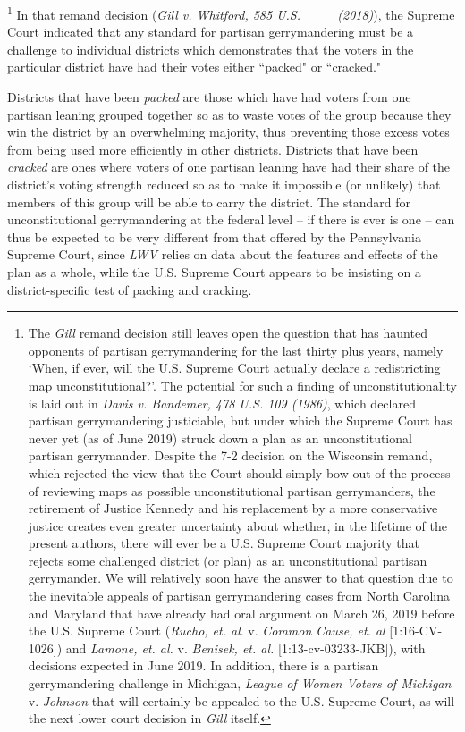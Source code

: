         \footnote{The \textit{Gill} remand decision still leaves open the question that has haunted opponents of partisan gerrymandering for the last thirty plus years, namely `When, if ever, will the U.S. Supreme Court actually declare a redistricting map unconstitutional?'.  The potential for such a finding of unconstitutionality is laid out in \textit{Davis v. Bandemer, 478 U.S. 109 (1986)}, which declared partisan gerrymandering justiciable, but under which the Supreme Court has never yet (as of June 2019) struck down a plan as an unconstitutional partisan gerrymander. Despite the 7-2 decision on the Wisconsin remand, which rejected the view that the Court should simply bow out of the process of reviewing maps as possible unconstitutional partisan gerrymanders, the retirement of Justice Kennedy and his replacement by a more conservative justice creates even greater uncertainty about whether, in the lifetime of the present authors, there will ever be a U.S. Supreme Court majority that rejects some challenged district (or plan) as an unconstitutional partisan gerrymander. We will relatively soon have the answer to that question due to the inevitable appeals of partisan gerrymandering cases from North Carolina and Maryland that have already had oral argument on March 26, 2019 before the U.S. Supreme Court (\textit{Rucho, et. al}. v. \textit{Common Cause, et. al} [1:16-CV-1026]) and \textit{Lamone, et. al.} v. \textit{Benisek, et. al.} [1:13-cv-03233-JKB]), with decisions expected in June 2019. In addition, there is a partisan gerrymandering challenge in Michigan, \textit{League of Women Voters of Michigan} v. \textit{Johnson} that will certainly be appealed to the U.S. Supreme Court, as will the next lower court decision in \textit{Gill} itself.}
    In that remand decision (\textit{Gill v. Whitford, 585 U.S. \_\_\_ (2018)}), the Supreme Court indicated that any standard for partisan gerrymandering must be a challenge to individual districts which demonstrates that the voters in the particular district have had their votes either ``packed" or ``cracked."
\par
    Districts that have been \textit{packed} are those which have had voters from one partisan leaning grouped together so as to waste votes of the group because they win the district by an overwhelming majority, thus preventing those excess votes from being used more efficiently in other districts. Districts that have been \textit{cracked} are ones where voters of one partisan leaning have had their share of the district’s voting strength reduced so as to make it impossible (or unlikely) that members of this group will be able to carry the district. The standard for unconstitutional gerrymandering at the federal level -- if there is ever is one -- can thus be expected to be very different from that offered by the Pennsylvania Supreme Court, since \textit{LWV} relies on data about the features and effects of the plan as a whole, while the U.S. Supreme Court appears to be insisting on a district-specific test of packing and cracking. 

